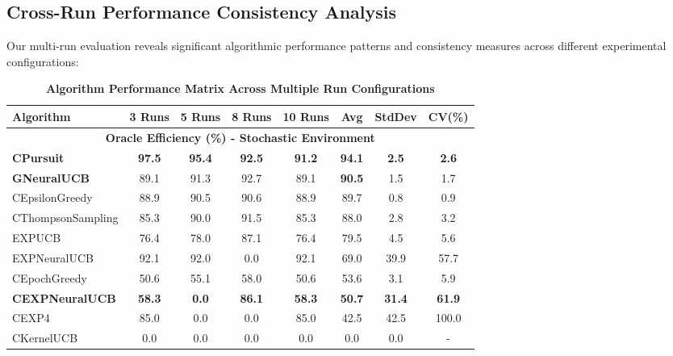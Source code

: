 \documentclass[12pt,a4paper]{article}
\newcommand{\performance}[1]{\textcolor{performancecolor}{\textbf{#1}}}
\newcommand{\critical}[1]{\textcolor{criticalcolor}{\textbf{#1}}}
\begin{document}
\begin{tcolorbox}[colback=performancecolor!10,colframe=performancecolor,title=\textbf{Primary Performance Results}]

\subsection{Cross-Run Performance Consistency Analysis}

Our multi-run evaluation reveals significant algorithmic performance patterns and consistency measures across different experimental configurations:

\begin{table}[H]
\centering
\caption{\performance{Algorithm Performance Matrix Across Multiple Run Configurations}}
\small
\begin{tabular}{|l|c|c|c|c|c|c|c|}
\hline
\textbf{Algorithm} & \textbf{3 Runs} & \textbf{5 Runs} & \textbf{8 Runs} & \textbf{10 Runs} & \textbf{Avg} & \textbf{StdDev} & \textbf{CV(\%)} \\
\hline
\hline
\multicolumn{8}{|c|}{\textbf{Oracle Efficiency (\%) - Stochastic Environment}} \\
\hline
\performance{CPursuit} & \performance{97.5} & \performance{95.4} & \performance{92.5} & \performance{91.2} & \performance{\textbf{94.1}} & \performance{2.5} & \performance{2.6} \\
\performance{GNeuralUCB} & 89.1 & 91.3 & 92.7 & 89.1 & \textbf{90.5} & 1.5 & 1.7 \\
CEpsilonGreedy & 88.9 & 90.5 & 90.6 & 88.9 & 89.7 & 0.8 & 0.9 \\
CThompsonSampling & 85.3 & 90.0 & 91.5 & 85.3 & 88.0 & 2.8 & 3.2 \\
EXPUCB & 76.4 & 78.0 & 87.1 & 76.4 & 79.5 & 4.5 & 5.6 \\
EXPNeuralUCB & 92.1 & 92.0 & 0.0 & 92.1 & 69.0 & 39.9 & 57.7 \\
CEpochGreedy & 50.6 & 55.1 & 58.0 & 50.6 & 53.6 & 3.1 & 5.9 \\
\critical{CEXPNeuralUCB} & \critical{58.3} & \critical{0.0} & \critical{86.1} & \critical{58.3} & \critical{50.7} & \critical{31.4} & \critical{61.9} \\
CEXP4 & 85.0 & 0.0 & 0.0 & 85.0 & 42.5 & 42.5 & 100.0 \\
CKernelUCB & 0.0 & 0.0 & 0.0 & 0.0 & 0.0 & 0.0 & - \\
\hline
\end{tabular}
\end{table}

\end{tcolorbox}
\end{document}
